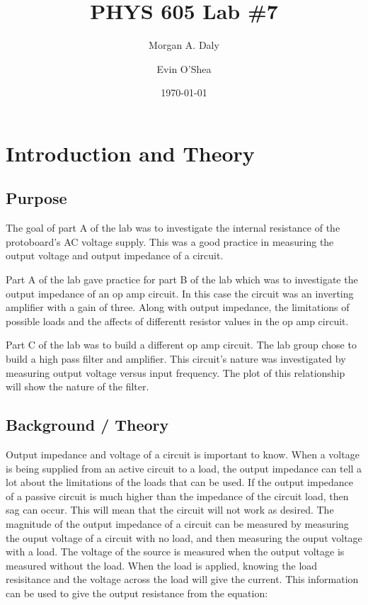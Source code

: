 \documentclass[twocolumn, amsmath]{revtex4}
\begin{document}
\title{PHYS 605 Lab \#7} 

\author{Morgan A. Daly}
\author{Evin O'Shea}
\date{\today} 


\maketitle


\section{Introduction and Theory}
\subsection{Purpose}

The goal of part A of the lab was to investigate the internal resistance of the protoboard's AC voltage supply. This was a good practice in measuring the output voltage and output impedance of a circuit. 

Part A of the lab gave practice for part B of the lab which was to investigate the output impedance of an op amp circuit. In this case the circuit was an inverting amplifier with a gain of three. Along with output impedance, the limitations of possible loads and the affects of differentt resistor values in the op amp circuit.

Part C of the lab was to build a different op amp circuit. The lab group chose to build a high pass filter and amplifier. This circuit's nature was investigated by measuring output voltage versus input frequency. The plot of this relationship will show the nature of the filter.

\subsection{Background / Theory}

Output impedance and voltage of a circuit is important to know. When a voltage is being supplied from an active circuit to a load, the output impedance can tell a lot about the limitations of the loads that can be used. If the output impedance of a passive circuit is much higher than the impedance of the circuit load, then sag can occur. This will mean that the circuit will not work as desired. The magnitude of the output impedance of a circuit can be measured by measuring the ouput voltage of a circuit with no load, and then measuring the ouput voltage with a load. The voltage of the source is measured when the output voltage is measured without the load. When the load is applied, knowing the load resisitance and the voltage across the load will give the current. This information can be used to give the output resistance from the equation:
\end{document}
